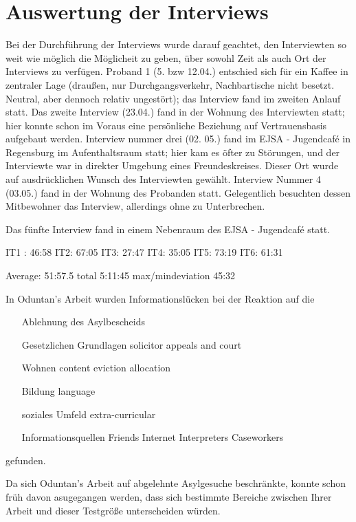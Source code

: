 \section{Auswertung der Interviews}

Bei der Durchführung der Interviews wurde darauf geachtet, den Interviewten so weit wie möglich die Möglicheit zu geben, über sowohl Zeit als auch Ort der Interviews zu verfügen. Proband 1 (5. bzw 12.04.) entschied sich für ein Kaffee in zentraler Lage (draußen, nur Durchgangsverkehr, Nachbartische nicht besetzt. Neutral, aber dennoch relativ ungestört); das Interview fand im zweiten Anlauf statt.\newline
Das zweite Interview (23.04.) fand in der Wohnung des Interviewten statt; hier konnte schon im Voraus eine persönliche Beziehung auf Vertrauensbasis aufgebaut werden.
Interview nummer drei (02. 05.) fand im EJSA - Jugendcafé in Regensburg im Aufenthaltsraum statt; hier kam es öfter zu Störungen, und der Interviewte war in direkter Umgebung eines Freundeskreises. Dieser Ort wurde auf ausdrücklichen Wunsch des Interviewten gewählt.
Interview Nummer 4 (03.05.) fand in der Wohnung des Probanden statt. Gelegentlich besuchten dessen Mitbewohner das Interview, allerdings ohne zu Unterbrechen. 

 Das fünfte Interview fand in einem Nebenraum des EJSA - Jugendcafé statt.

IT1 :	46:58
IT2: 	67:05
IT3:	27:47
IT4:	35:05
IT5:	73:19
IT6: 	61:31

Average:			51:57.5
total				5:11:45
max/mindeviation	45:32

In Oduntan's Arbeit wurden Informationslücken bei der Reaktion auf die 
\begin{enumerate}
	\item[Ablehnung des Asylbescheids]
		
	\item[Gesetzlichen Grundlagen]
		solicitor
		appeals and court
	\item [Wohnen]
		content
		eviction
		allocation
	\item [Bildung]
		language
	\item [soziales Umfeld]
		extra-curricular
	\item [Informationsquellen]
		Friends
		Internet
		Interpreters
		Caseworkers	
\end{enumerate} 

gefunden.\newline

Da sich Oduntan's Arbeit auf abgelehnte Asylgesuche beschränkte, konnte schon früh davon asugegangen werden, dass sich bestimmte Bereiche zwischen Ihrer Arbeit und dieser Testgröße unterscheiden würden.

